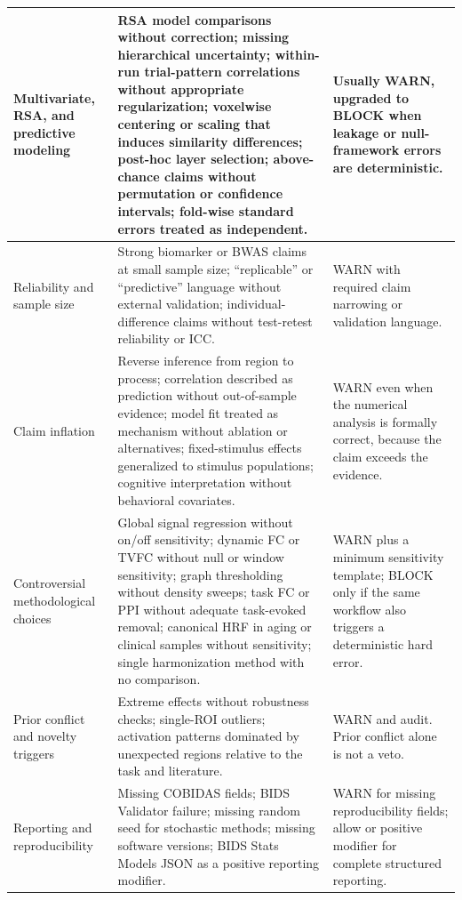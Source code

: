 \begin{longtable}{|>{\RaggedRight\hspace{0pt}\arraybackslash}p{}|>{\RaggedRight\hspace{0pt}\arraybackslash}p{}|>{\RaggedRight\hspace{0pt}\arraybackslash}p{}|}
\hline
Multivariate, RSA, and predictive modeling & RSA model comparisons without correction; missing hierarchical uncertainty; within-run trial-pattern correlations without appropriate regularization; voxelwise centering or scaling that induces similarity differences; post-hoc layer selection; above-chance claims without permutation or confidence intervals; fold-wise standard errors treated as independent. & Usually WARN, upgraded to BLOCK when leakage or null-framework errors are deterministic. \\
\hline
Reliability and sample size & Strong biomarker or BWAS claims at small sample size; ``replicable'' or ``predictive'' language without external validation; individual-difference claims without test-retest reliability or ICC. & WARN with required claim narrowing or validation language. \\
\hline
Claim inflation & Reverse inference from region to process; correlation described as prediction without out-of-sample evidence; model fit treated as mechanism without ablation or alternatives; fixed-stimulus effects generalized to stimulus populations; cognitive interpretation without behavioral covariates. & WARN even when the numerical analysis is formally correct, because the claim exceeds the evidence. \\
\hline
Controversial methodological choices & Global signal regression without on/off sensitivity; dynamic FC or TVFC without null or window sensitivity; graph thresholding without density sweeps; task FC or PPI without adequate task-evoked removal; canonical HRF in aging or clinical samples without sensitivity; single harmonization method with no comparison. & WARN plus a minimum sensitivity template; BLOCK only if the same workflow also triggers a deterministic hard error. \\
\hline
Prior conflict and novelty triggers & Extreme effects without robustness checks; single-ROI outliers; activation patterns dominated by unexpected regions relative to the task and literature. & WARN and audit. Prior conflict alone is not a veto. \\
\hline
Reporting and reproducibility & Missing COBIDAS fields; BIDS Validator failure; missing random seed for stochastic methods; missing software versions; BIDS Stats Models JSON as a positive reporting modifier. & WARN for missing reproducibility fields; allow or positive modifier for complete structured reporting. \\
\hline
\end{longtable}

